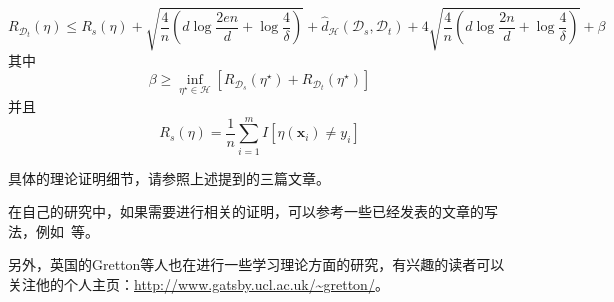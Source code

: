 \begin{equation}
	R_{\mathcal{D}_t}(\eta) \le R_s(\eta) + \sqrt{\frac{4}{n}(d \log \frac{2en}{d} + \log \frac{4}{\delta})} + \hat{d}_{\mathcal{H}}(\mathcal{D}_s,\mathcal{D}_t) + 4 \sqrt{\frac{4}{n}(d \log \frac{2n}{d} + \log \frac{4}{\delta})} + \beta
\end{equation}
其中
\begin{equation}
	\beta \ge \inf_{\eta^\star \in \mathcal{H}} [R_{\mathcal{D}_s}(\eta^\star) + R_{\mathcal{D}_t}(\eta^\star)]
\end{equation}
并且
\begin{equation}
	R_{s}(\eta) = \frac{1}{n} \sum_{i=1}^{m} I[\eta(\mathbf{x}_i) \ne y_i]
\end{equation}

具体的理论证明细节，请参照上述提到的三篇文章。

在自己的研究中，如果需要进行相关的证明，可以参考一些已经发表的文章的写法，例如~\cite{long2014adaptation}等。

另外，英国的Gretton等人也在进行一些学习理论方面的研究，有兴趣的读者可以关注他的个人主页：\url{http://www.gatsby.ucl.ac.uk/~gretton/}。
